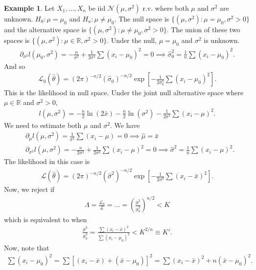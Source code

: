 \documentclass{book}
\theoremstyle{definition}
\newtheorem{exmp}{Example}[section]
\newcommand{\p}{\partial}
\newcommand{\lag}{\mathcal{L}}
\newcommand{\N}{\mathcal{N}}
\newcommand{\f}[2]{\frac{#1}{#2}}
\newcommand{\lp}{\left(}
\newcommand{\rp}{\right)}
\newcommand{\lb}{\left[}
\newcommand{\rb}{\right]}
\begin{document}
\begin{exmp}
	Let $X_1,\dots, X_n$ be iid $\N(\mu,\sigma^2)$ r.v. where both $\mu$ and $\sigma^2$ are unknown. $H_0 : \mu = \mu_0$ and $H_a : \mu \neq \mu_0$. The null space is $\{ (\mu,\sigma^2): \mu = \mu_0, \sigma^2 > 0 \}$ and the alternative space is $\{ (\mu,\sigma^2): \mu\neq \mu_0 , \sigma^2 > 0 \}$. The union of these two spaces is $\{ (\mu,\sigma^2): \mu \in \mathbb{R}, \sigma^2 > 0 \}$. Under the null, $\mu = \mu_0$ and $\sigma^2$ is unknown. 
	\begin{align}
	\p_{\sigma^2} l(\mu_0, \sigma^2) = -\f{n}{\sigma^2} + \f{1}{2\sigma^4}\sum (x_i - \mu_0)^2 = 0 \implies \hat\sigma_0^2 = \f{1}{n}\sum (x_i  - \mu_0)^2.
	\end{align} 
	And so 
	\begin{align}
	\lag_0(\hat\theta) = (2\pi)^{-n/2} (\hat\sigma_0)^{-n/2}\exp\lb -\f{1}{2\sigma_0^2}\sum(x_i - \mu_0)^2 \rb.
	\end{align}
	This is the likelihood in null space. Under the joint null alternative space where $\mu \in \mathbb{R}$ and $\sigma^2 > 0$, 
	\begin{align}
	l(\mu,\sigma^2) = -\f{n}{2}\ln(2\bar{x}) - \f{n}{2}\ln(\sigma^2) - \f{1}{2\sigma^2}\sum(x_i - \mu)^2.
	\end{align}
	We need to estimate both $\mu$ and $\sigma^2$. We have
	\begin{align}
	&\p_\mu l(\mu,\sigma^2) = \f{1}{\sigma^2}\sum(x_i - \mu) = 0 \implies \hat\mu = \bar{x} \\
	&\p_{\sigma^2} l(\mu,\sigma^2) = -\f{n}{2\sigma^2} + \f{1}{2\sigma^2}\sum(x_i - \mu)^2 = 0 \implies \hat\sigma^2 = \f{1}{n}\sum( x_i - \mu)^2.
	\end{align}
	The likelihood in this case is
	\begin{align}
	\lag(\hat\theta) = (2\pi)^{-n/2} (\hat\sigma^2)^{-n/2}\exp\lb -\f{1}{2\sigma^2}\sum(x_i - \bar{x})^2 \rb.
	\end{align}
	Now, we reject if 
	\begin{align}
	 \Lambda = \f{\lag_0}{\lag} = \dots = \lp \f{\hat\sigma^2}{\hat\sigma_0^2} \rp^{n/2} < K
	\end{align}
	which is equivalent to when 
	\begin{align}
	\f{\hat\sigma^2}{\hat\sigma_0^2} = \f{\sum(x_i - \bar{x})^2}{\sum (x_i - \mu_0)^2 } < K^{2/n} \equiv K'.
	\end{align}
	Now, note that 
	\begin{align}
	\sum (x_i - \mu_0)^2 = \sum\lb (x_i - \bar{x}) + (\bar{x} - \mu_0) \rb^2 = \sum (x_i - \bar{x})^2 + n(\bar{x} - \mu_0)^2.

\end{align}
\end{exmp}
\end{document}
